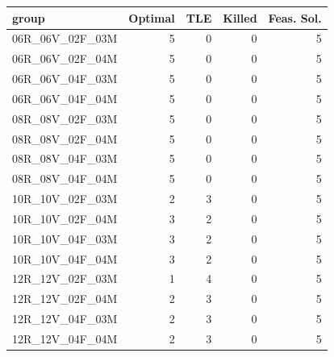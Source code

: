 
\begin{tabular}{lrrrr}
\toprule
group & Optimal & TLE & Killed & Feas. Sol.\\
\midrule
06R\_06V\_02F\_03M & 5 & 0 & 0 & 5\\
06R\_06V\_02F\_04M & 5 & 0 & 0 & 5\\
06R\_06V\_04F\_03M & 5 & 0 & 0 & 5\\
06R\_06V\_04F\_04M & 5 & 0 & 0 & 5\\
08R\_08V\_02F\_03M & 5 & 0 & 0 & 5\\
\addlinespace
08R\_08V\_02F\_04M & 5 & 0 & 0 & 5\\
08R\_08V\_04F\_03M & 5 & 0 & 0 & 5\\
08R\_08V\_04F\_04M & 5 & 0 & 0 & 5\\
10R\_10V\_02F\_03M & 2 & 3 & 0 & 5\\
10R\_10V\_02F\_04M & 3 & 2 & 0 & 5\\
\addlinespace
10R\_10V\_04F\_03M & 3 & 2 & 0 & 5\\
10R\_10V\_04F\_04M & 3 & 2 & 0 & 5\\
12R\_12V\_02F\_03M & 1 & 4 & 0 & 5\\
12R\_12V\_02F\_04M & 2 & 3 & 0 & 5\\
12R\_12V\_04F\_03M & 2 & 3 & 0 & 5\\
\addlinespace
12R\_12V\_04F\_04M & 2 & 3 & 0 & 5\\
\bottomrule
\end{tabular}
